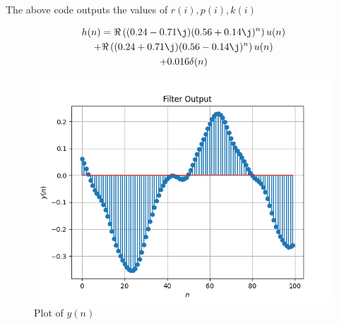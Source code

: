 \documentclass[journal,12pt,twocolumn]{IEEEtran}
\providecommand{\brak}[1]{\ensuremath{\left(#1\right)}}
\numberwithin{equation}{section}
\renewcommand\thesection{\arabic{section}}
\begin{document}
\begin{enumerate}[label=\thesection.\arabic*]
	The above code outputs the values of $r(i), p(i), k(i)$

	\begin{multline}
		h(n) = 
			\Re\brak{(0.24 - 0.71\j)(0.56 + 0.14\j)^n} u(n) \\
			+ \Re\brak{(0.24 + 0.71\j)(0.56 - 0.14\j)^n} u(n) \\
			+ 0.016\delta(n)
	\end{multline}
	
	\begin{figure}[!ht]
		\centering
		\includegraphics[width=\columnwidth]{./figs/7.2.1.png}
		\caption{Plot of $y(n)$}
		\label{fig-7.2.1}	
	\end{figure}
	

\end{enumerate}
\end{document}
